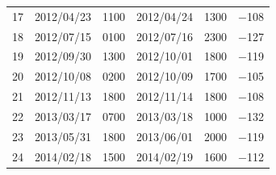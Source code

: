 \documentclass{article}
\begin{document}
\begin{table}[h]
\begin{tabular}{llllll}
    17 & 2012/04/23 & 1100 & 2012/04/24 & 1300 & −108 \\
    18 & 2012/07/15 & 0100 & 2012/07/16 & 2300 & −127 \\
    19 & 2012/09/30 & 1300 & 2012/10/01 & 1800 & −119 \\
    20 & 2012/10/08 & 0200 & 2012/10/09 & 1700 & −105 \\
    21 & 2012/11/13 & 1800 & 2012/11/14 & 1800 & −108 \\
    22 & 2013/03/17 & 0700 & 2013/03/18 & 1000 & −132 \\
    23 & 2013/05/31 & 1800 & 2013/06/01 & 2000 & −119 \\
    24 & 2014/02/18 & 1500 & 2014/02/19 & 1600 & −112
  \end{tabular}
\end{table}
\end{document}
